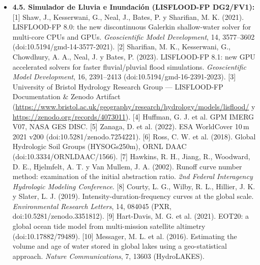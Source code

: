 \documentclass[10pt,a4paper]{article}
\begin{document}
\begin{itemize}
[2] Ineichen, P. y Perez, R. (2002). A new airmass independent formulation for the Linke turbidity coefficient. \emph{Solar Energy}, 73(3), 151–157 (doi:10.1016/S0038-092X(02)00045-2).
[3] Kasten, F. y Young, A. T. (1989). Revised optical air mass tables and approximation formula. \emph{Applied Optics}, 28(22), 4735–4738 (doi:10.1364/AO.28.004735).
[4] Dubayah, R. y Rich, P. M. (1995). Topographic solar radiation models for GIS. \emph{International Journal of Geographical Information Systems}, 9(4), 405–419 (doi:10.1080/02693799508902046).
[5] Holmgren, W. F., Hansen, C. W. y Mikofski, M. A. (2018). pvlib python: a Python package for modeling solar energy systems. \emph{Journal of Open Source Software}, 3(29), 884 (doi:10.21105/joss.00884).
\item \textbf{4.5. Simulador de Lluvia e Inundación (LISFLOOD-FP DG2/FV1):}
[1] Shaw, J., Kesserwani, G., Neal, J., Bates, P. y Sharifian, M. K. (2021). LISFLOOD-FP 8.0: the new discontinuous Galerkin shallow-water solver for multi-core CPUs and GPUs. \emph{Geoscientific Model Development}, 14, 3577–3602 (doi:10.5194/gmd-14-3577-2021).
[2] Sharifian, M. K., Kesserwani, G., Chowdhury, A. A., Neal, J. y Bates, P. (2023). LISFLOOD-FP 8.1: new GPU accelerated solvers for faster fluvial/pluvial flood simulations. \emph{Geoscientific Model Development}, 16, 2391–2413 (doi:10.5194/gmd-16-2391-2023).
[3] University of Bristol Hydrology Research Group — LISFLOOD-FP Documentation \& Zenodo Artifact (\url{https://www.bristol.ac.uk/geography/research/hydrology/models/lisflood/} y \url{https://zenodo.org/records/4073011}).
[4] Huffman, G. J. et al. GPM IMERG V07, NASA GES DISC.
[5] Zanaga, D. et al. (2022). ESA WorldCover 10\,m 2021 v200 (doi:10.5281/zenodo.7254221).
[6] Ross, C. W. et al. (2018). Global Hydrologic Soil Groups (HYSOGs250m), ORNL DAAC (doi:10.3334/ORNLDAAC/1566).
[7] Hawkins, R. H., Jiang, R., Woodward, D. E., Hjelmfelt, A. T. y Van Mullem, J. A. (2002). Runoff curve number method: examination of the initial abstraction ratio. \emph{2nd Federal Interagency Hydrologic Modeling Conference}.
[8] Courty, L. G., Wilby, R. L., Hillier, J. K. y Slater, L. J. (2019). Intensity-duration-frequency curves at the global scale. \emph{Environmental Research Letters}, 14, 084045 (PXR, doi:10.5281/zenodo.3351812).
[9] Hart-Davis, M. G. et al. (2021). EOT20: a global ocean tide model from multi-mission satellite altimetry (doi:10.17882/79489).
[10] Messager, M. L. et al. (2016). Estimating the volume and age of water stored in global lakes using a geo-statistical approach. \emph{Nature Communications}, 7, 13603 (HydroLAKES).

\end{itemize}
\end{document}
